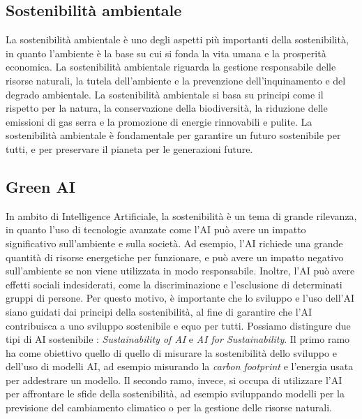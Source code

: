 \subsection{Sostenibilità ambientale}
La sostenibilità ambientale è uno degli aspetti più importanti della sostenibilità, in quanto l'ambiente è la base su cui si fonda la vita umana e la prosperità economica. La sostenibilità ambientale riguarda la gestione responsabile delle risorse naturali, la tutela dell'ambiente e la prevenzione dell'inquinamento e del degrado ambientale. La sostenibilità ambientale si basa su principi come il rispetto per la natura, la conservazione della biodiversità, la riduzione delle emissioni di gas serra e la promozione di energie rinnovabili e pulite. La sostenibilità ambientale è fondamentale per garantire un futuro sostenibile per tutti, e per preservare il pianeta per le generazioni future.


\subsection{Green AI}

In ambito di Intelligence Artificiale, la sostenibilità è un tema di grande rilevanza, in quanto l'uso di tecnologie avanzate come l'AI può avere un impatto significativo sull'ambiente e sulla società. Ad esempio, l'AI richiede una grande quantità di risorse energetiche per funzionare, e può avere un impatto negativo sull'ambiente se non viene utilizzata in modo responsabile. Inoltre, l'AI può avere effetti sociali indesiderati, come la discriminazione e l'esclusione di determinati gruppi di persone. Per questo motivo, è importante che lo sviluppo e l'uso dell'AI siano guidati dai principi della sostenibilità, al fine di garantire che l'AI contribuisca a uno sviluppo sostenibile e equo per tutti.
Possiamo distingure due tipi di AI sostenibile \cite{sostenibilita}: \textit{Sustainability of AI} e \textit{AI for Sustainability}. Il primo ramo ha come obiettivo quello di quello di misurare la sostenibilità dello sviluppo e dell'uso di modelli AI, ad esempio misurando la \textit{carbon footprint} e l'energia usata per addestrare un modello. Il secondo ramo, invece, si occupa di utilizzare l'AI per affrontare le sfide della sostenibilità, ad esempio sviluppando modelli per la previsione del cambiamento climatico o per la gestione delle risorse naturali.


